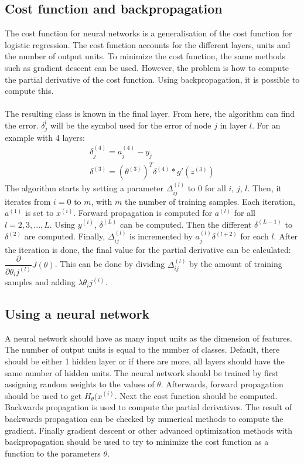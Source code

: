 \subsection{Cost function and backpropagation}
The cost function for neural networks is a generalisation of the cost function for logistic regression. The cost function accounts for the different layers, units and the number of output units. To minimize the cost function, the same methods such as gradient descent can be used. However, the problem is how to compute the partial derivative of the cost function. Using backpropagation, it is possible to compute this. \\\\
The resulting class is known in the final layer. From here, the algorithm can find the error. $\delta_j^l$ will be the symbol used for the error of node $j$ in layer $l$. For an example with 4 layers:
\begin{align}
\delta_j^{(4)} = a_j^{(4)} - y_j\\
\delta^{(3)} = (\theta^{(3)})^T\delta^{(4)} * g'(z^{(3)})
\end{align}
The algorithm starts by setting a parameter $\Delta_{ij}^{(l)}$ to 0 for all $i$, $j$, $l$. Then, it iterates from $i=0$ to $m$, with $m$ the number of training samples. Each iteration, $a^{(1)}$ is set to $x^{(i)}$. Forward propagation is computed for $a^{(l)}$ for all $l = 2,3,..., L$. Using $y^{(i)}$, $\delta^{(L)}$ can be computed. Then the different $\delta^{(L-1)}$ to $\delta^{(2)}$ are computed. Finally, $\Delta_{ij}^{(l)}$ is incremented by $a_j^{(l)}\delta^{(l+2)}$ for each $l$. After the iteration is done, the final value for the partial derivative can be calculated: $\dfrac{\partial}{\partial \theta_ij^{(l)}} J(\theta)$. This can be done by dividing $\Delta_{ij}^{(l)}$ by the amount of training samples and adding $\lambda\theta_ij^{(i)}$. 
\subsection{Using a neural network}
A neural network should have as many input units as the dimension of features. The number of output units is equal to the number of classes. Default, there should be either 1 hidden layer or if there are more, all layers should have the same number of hidden units. The neural network should be trained by first assigning random weights to the values of $\theta$. Afterwards, forward propagation should be used to get $H_\theta(x^{(i)}$. Next the cost function should be computed. Backwards propagation is used to compute the partial derivatives. The result of backwards propagation can be checked by numerical methods to compute the gradient. Finally gradient descent or other advanced optimization methods with backpropagation should be used to try to minimize the cost function as a function to the parameters $\theta$.

